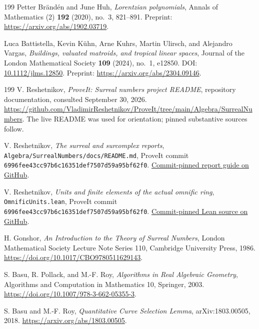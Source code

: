\documentclass[11pt,a4paper]{article}
\numberwithin{equation}{section}
\theoremstyle{plain}
\newcounter{polybibc}
\newenvironment{polybiblist}[1]{\let\section\subsection\renewcommand{\refname}{#1}%
 \begin{thebibliography}{199}\setcounter{enumiv}{\value{polybibc}}}%
 {\setcounter{polybibc}{\value{enumiv}}\end{thebibliography}}
\begin{document}
\begin{polybiblist}{Part III (manuscript 06)}
Petter Br\"and\'en and June Huh,
\emph{Lorentzian polynomials}, Annals of Mathematics (2)
\textbf{192} (2020), no.~3, 821--891.
Preprint: \url{https://arxiv.org/abs/1902.03719}.

Luca Battistella, Kevin K\"uhn, Arne Kuhrs, Martin Ulirsch, and
Alejandro Vargas,
\emph{Buildings, valuated matroids, and tropical linear spaces},
Journal of the London Mathematical Society \textbf{109} (2024), no.~1,
e12850. DOI: \href{https://doi.org/10.1112/jlms.12850}{10.1112/jlms.12850}.
Preprint: \url{https://arxiv.org/abs/2304.09146}.

\end{polybiblist}
\begin{polybiblist}{Part IV (manuscript 03)}
\small
{}
V. Reshetnikov, \emph{ProveIt: Surreal numbers project README},
repository documentation, consulted September 30, 2026.
\url{https://github.com/VladimirReshetnikov/ProveIt/tree/main/Algebra/SurrealNumbers}.
The live README was used for orientation; pinned substantive sources follow.

V. Reshetnikov, \emph{The surreal and surcomplex reports},
\texttt{Algebra/SurrealNumbers/docs/README.md},
ProveIt commit \texttt{6996fee43cc97b6c16351def7507d59a95bf62f0}.
\href{https://github.com/VladimirReshetnikov/ProveIt/blob/6996fee43cc97b6c16351def7507d59a95bf62f0/Algebra/SurrealNumbers/docs/README.md}{Commit-pinned report guide on GitHub}.

V. Reshetnikov, \emph{Units and finite elements of the actual omnific ring},
\texttt{OmnificUnits.lean}, ProveIt commit
\texttt{6996fee43cc97b6c16351def7507d59a95bf62f0}.
\href{https://github.com/VladimirReshetnikov/ProveIt/blob/6996fee43cc97b6c16351def7507d59a95bf62f0/Algebra/SurrealNumbers/Surreal/Foundations/OmnificUnits.lean}{Commit-pinned Lean source on GitHub}.

H. Gonshor, \emph{An Introduction to the Theory of Surreal Numbers},
London Mathematical Society Lecture Note Series 110, Cambridge University
Press, 1986. \url{https://doi.org/10.1017/CBO9780511629143}.

S. Basu, R. Pollack, and M.-F. Roy, \emph{Algorithms in Real Algebraic
Geometry}, Algorithms and Computation in Mathematics 10, Springer, 2003.
\url{https://doi.org/10.1007/978-3-662-05355-3}.

S. Basu and M.-F. Roy, \emph{Quantitative Curve Selection Lemma},
arXiv:1803.00505, 2018. \url{https://arxiv.org/abs/1803.00505}.


\end{polybiblist}
\end{document}
